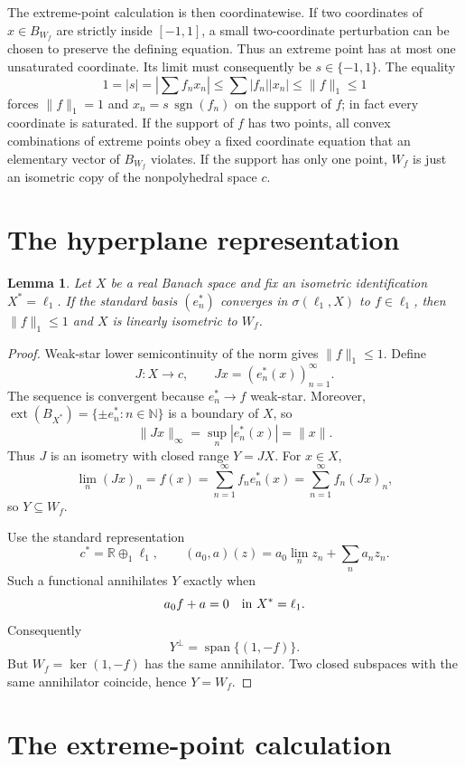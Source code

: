 \documentclass[11pt]{article}
\newtheorem{lemma}[theorem]{Lemma}
\newcommand{\R}{\mathbb R}
\newcommand{\ext}{\operatorname{ext}}
\begin{document}
The extreme-point calculation is then coordinatewise. If two coordinates of
$x\in B_{W_f}$ are strictly inside $[-1,1]$, a small two-coordinate
perturbation can be chosen to preserve the defining equation. Thus an extreme
point has at most one unsaturated coordinate. Its limit must consequently be
$s\in\{-1,1\}$. The equality
\[
 1=|s|=\left|\sum f_nx_n\right|
       \le \sum |f_n||x_n|\le\|f\|_1\le1
\]
forces $\|f\|_1=1$ and $x_n=s\,\operatorname{sgn}(f_n)$ on the support of
$f$; in fact every coordinate is saturated. If the support of $f$ has two
points, all convex combinations of extreme points obey a fixed coordinate
equation that an elementary vector of $B_{W_f}$ violates. If the support has
only one point, $W_f$ is just an isometric copy of the nonpolyhedral space
$c$.

\section{The hyperplane representation}

\begin{lemma}\label{lem:representation}
Let $X$ be a real Banach space and fix an isometric identification
$X^*=\ell_1$. If the standard basis $(e_n^*)$ converges in
$\sigma(\ell_1,X)$ to $f\in\ell_1$, then $\|f\|_1\le1$ and $X$ is linearly
isometric to $W_f$.
\end{lemma}

\begin{proof}
Weak-star lower semicontinuity of the norm gives $\|f\|_1\le1$. Define
\[
 J:X\longrightarrow c,\qquad Jx=(e_n^*(x))_{n=1}^{\infty}.
\]
The sequence is convergent because $e_n^*\to f$ weak-star. Moreover,
$\ext(B_{X^*})=\{\pm e_n^*:n\in\mathbb N\}$ is a boundary of $X$, so
\[
                 \|Jx\|_\infty=\sup_n|e_n^*(x)|=\|x\|.
\]
Thus $J$ is an isometry with closed range $Y=JX$. For $x\in X$,
\[
 \lim_n(Jx)_n=f(x)=\sum_{n=1}^{\infty}f_ne_n^*(x)
                  =\sum_{n=1}^{\infty}f_n(Jx)_n,
\]
so $Y\subseteq W_f$.

Use the standard representation
\[
 c^*=\R\oplus_1\ell_1,
 \qquad (a_0,a)(z)=a_0\lim_nz_n+\sum_na_nz_n.
\]
Such a functional annihilates $Y$ exactly when
\[
            a_0f+a=0\quad\hbox{in }X^*=\ell_1.
\]
Consequently
\[
 Y^\perp=\operatorname{span}\{(1,-f)\}.
\]
But $W_f=\ker(1,-f)$ has the same annihilator. Two closed subspaces with the
same annihilator coincide, hence $Y=W_f$.
\end{proof}

\section{The extreme-point calculation}
\end{document}
